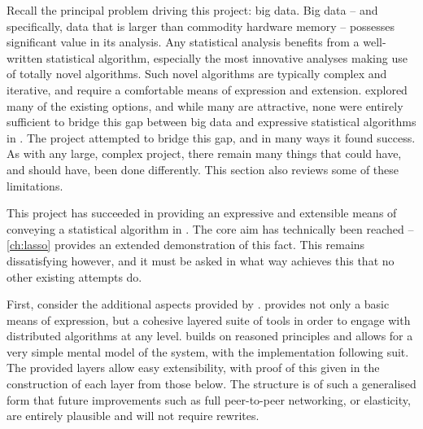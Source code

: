 Recall the principal problem driving this project: big data.
Big data -- and specifically, data that is larger than commodity hardware memory -- possesses significant value in its analysis.
Any statistical analysis benefits from a well-written statistical algorithm, especially the most innovative analyses making use of totally novel algorithms.
Such novel algorithms are typically complex and iterative, and require a comfortable means of expression and extension.
 explored many of the existing options, and while many are attractive, none were entirely sufficient to bridge this gap between big data and expressive statistical algorithms in \R{}.
The \lsr{} project attempted to bridge this gap, and in many ways it found success.
As with any large, complex project, there remain many things that could have, and should have, been done differently.
This section also reviews some of these limitations.

This project has succeeded in providing an expressive and extensible means of conveying a statistical algorithm in \R{}.
The core aim has technically been reached -- \cref{ch:lasso} provides an extended demonstration of this fact.
This remains dissatisfying however, and it must be asked in what way \lsr{} achieves this that no other existing attempts do.

First, consider the additional aspects provided by \lsr{}.
\lsr{} provides not only a basic means of expression, but a cohesive layered suite of tools in order to engage with distributed algorithms at any level.
\lsr{} builds on reasoned principles and allows for a very simple mental model of the system, with the implementation following suit.
The provided layers allow easy extensibility, with proof of this given in the construction of each layer from those below.
The structure is of such a generalised form that future improvements such as full peer-to-peer networking, or elasticity, are entirely plausible and will not require rewrites.

